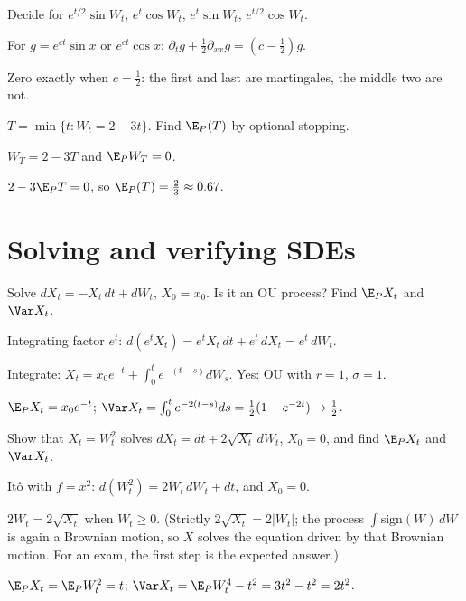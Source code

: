 \begin{problem}
Decide for $e^{t/2}\sin W_t$, $e^t\cos W_t$, $e^{t}\sin W_t$, $e^{t/2}\cos W_t$.
\begin{steps}
  \item For $g=e^{ct}\sin x$ or $e^{ct}\cos x$: $\partial_tg+\frac12\partial_{xx}g=(c-\frac12)g$.
  \item Zero exactly when $c=\frac12$: the first and last are martingales, the middle two are not.
\end{steps}
\end{problem}

\begin{problem}
$T=\min\{t:W_t=2-3t\}$. Find $\E_P(T)$ by optional stopping.
\begin{steps}
  \item $W_T=2-3T$ and $\E_PW_T=0$.
  \item $2-3\E_PT=0$, so $\E_P(T)=\frac23\approx0.67$.
\end{steps}
\end{problem}

\section{Solving and verifying SDEs}

\begin{problem}
Solve $dX_t=-X_t\,dt+dW_t$, $X_0=x_0$. Is it an OU process? Find $\E_PX_t$ and $\Var X_t$.
\begin{steps}
  \item Integrating factor $e^t$: $d(e^tX_t)=e^tX_t\,dt+e^t\,dX_t=e^t\,dW_t$.
  \item Integrate: $X_t=x_0e^{-t}+\int_0^te^{-(t-s)}dW_s$. Yes: OU with $r=1$, $\sigma=1$.
  \item $\E_PX_t=x_0e^{-t}$; $\Var X_t=\int_0^te^{-2(t-s)}ds=\frac12(1-e^{-2t})\to\frac12$.
\end{steps}
\end{problem}

\begin{problem}
Show that $X_t=W_t^2$ solves $dX_t=dt+2\sqrt{X_t}\,dW_t$, $X_0=0$, and find $\E_PX_t$ and $\Var X_t$.
\begin{steps}
  \item Itô with $f=x^2$: $d(W_t^2)=2W_t\,dW_t+dt$, and $X_0=0$.
  \item $2W_t=2\sqrt{X_t}$ when $W_t\ge0$. (Strictly $2\sqrt{X_t}=2|W_t|$; the process $\int\text{sign}(W)\,dW$ is again a Brownian motion, so $X$ solves the equation driven by that Brownian motion. For an exam, the first step is the expected answer.)
  \item $\E_PX_t=\E_PW_t^2=t$; $\Var X_t=\E_PW_t^4-t^2=3t^2-t^2=2t^2$.
\end{steps}
\end{problem}

